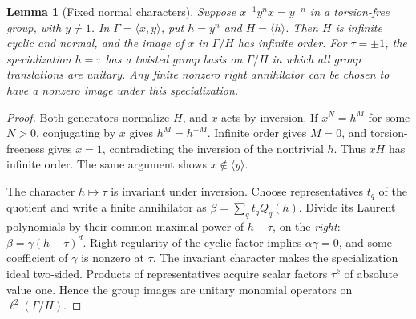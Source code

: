 \documentclass[11pt,a4paper,oneside]{report}
\newtheorem{lemma}[theorem]{Lemma}
\theoremstyle{definition}
\theoremstyle{remark}
\begin{document}
\begin{lemma}[Fixed normal characters]
\label{M13:invpower:fiber}
Suppose $x^{-1}y^n x=y^{-n}$ in a torsion-free group, with $y\ne1$.
In $\Gamma=\langle x,y\rangle$, put $h=y^n$ and
$H=\langle h\rangle$. Then $H$ is infinite cyclic and normal,
and the image of $x$ in $\Gamma/H$ has infinite order.
For $\tau=\pm1$, the specialization $h=\tau$ has a twisted group
basis on $\Gamma/H$ in which all group translations are unitary.
Any finite nonzero right annihilator can be chosen to have a
nonzero image under this specialization.
\end{lemma}
\begin{proof}
Both generators normalize $H$, and $x$ acts by inversion.
If $x^N=h^M$ for some $N>0$, conjugating by $x$ gives
$h^M=h^{-M}$. Infinite order gives $M=0$, and torsion-freeness
gives $x=1$, contradicting the inversion of the nontrivial $h$.
Thus $xH$ has infinite order. The same argument shows
$x\notin\langle y\rangle$.

The character $h\mapsto\tau$ is invariant under inversion.
Choose representatives $t_q$ of the quotient and write a finite
annihilator as $\beta=\sum_q t_qQ_q(h)$. Divide its Laurent
polynomials by their common maximal power of $h-\tau$, on the
\emph{right}: $\beta=\gamma(h-\tau)^d$.
Right regularity of the cyclic factor implies
$\alpha\gamma=0$, and some coefficient of $\gamma$ is nonzero
at $\tau$. The invariant character makes the specialization ideal
two-sided. Products of representatives acquire scalar factors
$\tau^k$ of absolute value one. Hence the group images are
unitary monomial operators on $\ell^2(\Gamma/H)$.
\end{proof}
\end{document}
